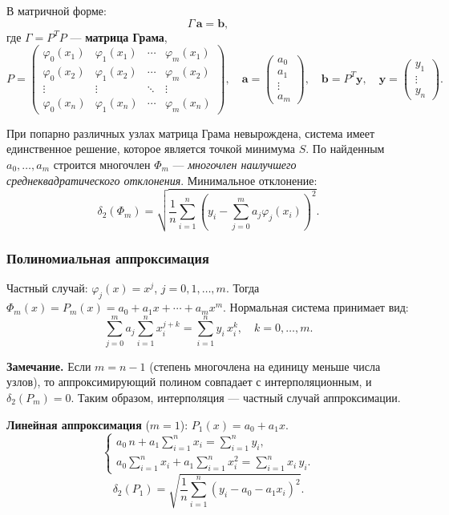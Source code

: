 В матричной форме:
\[
    \Gamma\, \mathbf{a} = \mathbf{b},
\]
где $\Gamma = P^T P$ --- \textbf{матрица Грама},
\[
    P = \begin{pmatrix}
        \varphi_0(x_1) & \varphi_1(x_1) & \cdots & \varphi_m(x_1) \\
        \varphi_0(x_2) & \varphi_1(x_2) & \cdots & \varphi_m(x_2) \\
        \vdots & \vdots & \ddots & \vdots \\
        \varphi_0(x_n) & \varphi_1(x_n) & \cdots & \varphi_m(x_n)
    \end{pmatrix},
    \quad
    \mathbf{a} = \begin{pmatrix} a_0 \\ a_1 \\ \vdots \\ a_m \end{pmatrix},
    \quad
    \mathbf{b} = P^T \mathbf{y},
    \quad
    \mathbf{y} = \begin{pmatrix} y_1 \\ \vdots \\ y_n \end{pmatrix}.
\]

При попарно различных узлах матрица Грама невырождена, система имеет единственное решение, которое является точкой минимума $S$. По найденным $a_0, \ldots, a_m$ строится многочлен $\Phi_m$ --- \textit{многочлен наилучшего среднеквадратического отклонения}. Минимальное отклонение:
\[
    \delta_2(\Phi_m) = \sqrt{\frac{1}{n} \sum_{i=1}^{n} \left(y_i - \sum_{j=0}^{m} a_j \varphi_j(x_i)\right)^2}.
\]

\subsubsection*{Полиномиальная аппроксимация}

Частный случай: $\varphi_j(x) = x^j$, $j = 0, 1, \ldots, m$. Тогда $\Phi_m(x) = P_m(x) = a_0 + a_1 x + \cdots + a_m x^m$. Нормальная система принимает вид:
\[
    \sum_{j=0}^{m} a_j \sum_{i=1}^{n} x_i^{j+k} = \sum_{i=1}^{n} y_i\, x_i^k, \quad k = 0, \ldots, m.
\]

\textbf{Замечание.} Если $m = n - 1$ (степень многочлена на единицу меньше числа узлов), то аппроксимирующий полином совпадает с интерполяционным, и $\delta_2(P_m) = 0$. Таким образом, интерполяция --- частный случай аппроксимации.

\textbf{Линейная аппроксимация} ($m = 1$): $P_1(x) = a_0 + a_1 x$.
\[
    \begin{cases}
        \displaystyle a_0\, n + a_1 \sum_{i=1}^{n} x_i = \sum_{i=1}^{n} y_i, \\[6pt]
        \displaystyle a_0 \sum_{i=1}^{n} x_i + a_1 \sum_{i=1}^{n} x_i^2 = \sum_{i=1}^{n} x_i\, y_i.
    \end{cases}
\]
\[
    \delta_2(P_1) = \sqrt{\frac{1}{n} \sum_{i=1}^{n} (y_i - a_0 - a_1 x_i)^2}.
\]

